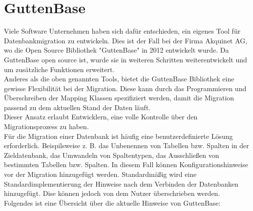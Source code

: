 \section{GuttenBase}
Viele Software Unternehmen haben sich dafür entschieden, ein eigenes Tool für Datenbankmigration zu entwickeln. Dies ist der Fall bei der Firma Akquinet AG, wo die Open Source Bibliothek "GuttenBase" in 2012 entwickelt wurde. Da GuttenBase open source ist, wurde sie in weiteren Schritten weiterentwickelt und um zusätzliche Funktionen erweitert.\\
Anderes als die oben genannten Tools, bietet die GuttenBase Bibliothek eine gewisse Flexibilität bei der Migration. Diese kann durch das Programmieren und Überschreiben der Mapping Klassen spezifiziert werden, damit die Migration passend zu dem aktuellen Stand der Daten läuft.\\
Dieser Ansatz erlaubt Entwicklern, eine volle Kontrolle über den Migrationsprozess zu haben.\\
Für die Migration einer Datenbank ist häufig eine benutzerdefinierte Lösung erforderlich. Beispilsweise z. B. das Unbenennen von Tabellen bzw. Spalten in der Zieldatenbank, das Umwandeln von Spaltentypen, das Ausschließen von bestimmten Tabellen bzw. Spalten.
In diesem Fall können Konfigurationshinweise vor der Migration hinzugefügt werden. Standardmäßig wird eine Standardimplementierung der Hinweise nach dem Verbinden der Datenbanken hinzugefügt. Dise können jedoch von dem Nutzer überschrieben werden. \\
Folgendes ist eine Übersicht über die aktuelle Hinweise von GuttenBase: \\



